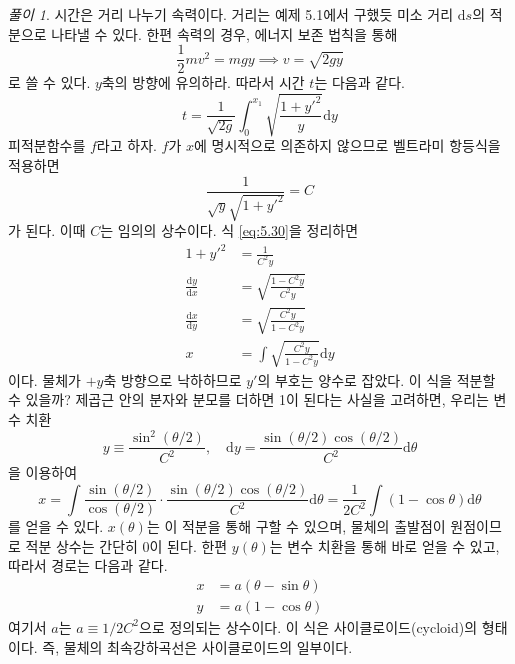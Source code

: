 \documentclass[chapter, oneside, b5paper]{oblivoir}
\theoremstyle{plain}
\theoremstyle{definition}
\theoremstyle{remark}
\newtheorem*{solution}{풀이}
\begin{document}
\begin{solution}
    시간은 거리 나누기 속력이다. 거리는 예제 5.1에서 구했듯 미소 거리 $\mathrm{d}s$의 적분으로 나타낼 수 있다. 한편 속력의 경우, 에너지 보존 법칙을 통해
    \begin{equation}
        \frac{1}{2}mv^2 = mgy \implies v = \sqrt{2gy}
    \end{equation}
   로 쓸 수 있다. $y$축의 방향에 유의하라. 따라서 시간 $t$는 다음과 같다.
    \begin{equation}
        t = \frac{1}{\sqrt{2g}} \int_0^{x_1} \sqrt{\frac{1+{y'}^2}{y}} \mathrm{d}y
        \label{eq:5.29}
    \end{equation}
    피적분함수를 $f$라고 하자. $f$가 $x$에 명시적으로 의존하지 않으므로 벨트라미 항등식을 적용하면
    \begin{equation}
        \frac{1}{\sqrt{y}\sqrt{1+{y'}^2}} = C
        \label{eq:5.30}
    \end{equation}
    가 된다. 이때 $C$는 임의의 상수이다. 식 \ref{eq:5.30}을 정리하면
    \begin{equation}
        \begin{aligned}
            1+{y'}^2 &= \frac{1}{C^2 y} \\
            \frac{\mathrm{d}y}{\mathrm{d}x} &= \sqrt{\frac{1-C^2 y}{C^2 y}} \\
            \frac{\mathrm{d}x}{\mathrm{d}y} &= \sqrt{\frac{C^2 y}{1-C^2 y}} \\
            x &= \int \sqrt{\frac{C^2 y}{1-C^2 y}} \mathrm{d}y
        \end{aligned}
    \end{equation}
    이다. 물체가 $+y$축 방향으로 낙하하므로 $y'$의 부호는 양수로 잡았다. 이 식을 적분할 수 있을까? 제곱근 안의 분자와 분모를 더하면 1이 된다는 사실을 고려하면, 우리는 변수 치환
    \begin{equation*}
        y \equiv \frac{\sin^2{(\theta/2)}}{C^2}, \quad \mathrm{d}y = \frac{\sin{(\theta/2)}\cos{(\theta/2)}}{C^2}\mathrm{d}\theta
    \end{equation*}
        을 이용하여
    \begin{equation}
        x = \int \frac{\sin{(\theta/2)}}{\cos{(\theta/2)}} \cdot \frac{\sin{(\theta/2)}\cos{(\theta/2)}}{C^2}\mathrm{d}\theta = \frac{1}{2C^2} \int (1-\cos{\theta})\mathrm{d}\theta
    \end{equation}
    를 얻을 수 있다. $x(\theta)$는 이 적분을 통해 구할 수 있으며, 물체의 출발점이 원점이므로 적분 상수는 간단히 $0$이 된다. 한편 $y(\theta)$는 변수 치환을 통해 바로 얻을 수 있고, 따라서 경로는 다음과 같다.
    \begin{equation}
    \begin{aligned}
        x &= a(\theta-\sin{\theta}) \\
        y &= a(1-\cos{\theta})
    \end{aligned}
    \label{eq:5.33}
    \end{equation}
    여기서 $a$는 $a\equiv 1/2C^2$으로 정의되는 상수이다. 이 식은 사이클로이드(cycloid)의 형태이다. 즉, 물체의 최속강하곡선은 사이클로이드의 일부이다.


\end{solution}
\end{document}
